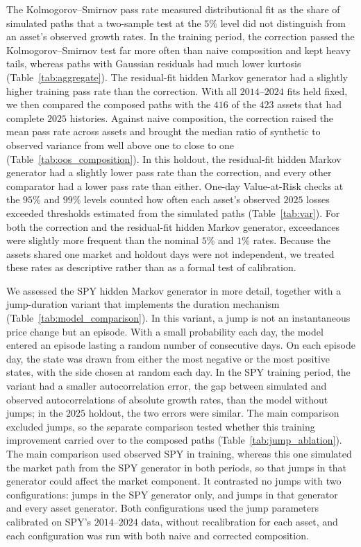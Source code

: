 The Kolmogorov--Smirnov pass rate measured distributional fit as the
share of simulated paths that a two-sample test at the $5\%$ level did
not distinguish from an asset's observed growth rates. In the training period, the correction passed the Kolmogorov--Smirnov
test far more often than naive composition and kept heavy tails,
whereas paths with Gaussian residuals had much lower kurtosis
(Table~\ref{tab:aggregate}).
The residual-fit hidden Markov generator had a slightly higher training
pass rate than the correction. With all $2014$--$2024$ fits held fixed,
we then compared the composed paths with the $416$ of the $423$ assets
that had complete $2025$ histories. Against naive composition, the
correction raised the mean pass rate across assets and brought the
median ratio of synthetic to observed variance from well above one to
close to one (Table~\ref{tab:oos_composition}). In this holdout, the
residual-fit hidden Markov generator had a slightly lower pass rate
than the correction, and every other comparator had a lower pass rate
than either. One-day Value-at-Risk checks at the $95\%$ and $99\%$
levels counted how often each asset's observed $2025$ losses exceeded
thresholds estimated from the simulated paths (Table~\ref{tab:var}).
For both the correction and the residual-fit hidden Markov generator,
exceedances were slightly more frequent than the nominal $5\%$ and
$1\%$ rates. Because the assets shared one market and holdout days were
not independent, we treated these rates as descriptive rather than as a
formal test of calibration.

We assessed the SPY hidden Markov generator in more detail, together
with a jump-duration variant that implements the duration mechanism
(Table~\ref{tab:model_comparison}). In this variant, a jump
is not an instantaneous price change but an episode. With a small
probability each day, the model entered an episode lasting a random
number of consecutive days. On each episode day, the state was drawn
from either the most negative or the most positive states, with the
side chosen at random each day. In the SPY training period, the variant had a smaller autocorrelation
error, the gap between simulated and observed autocorrelations of
absolute growth rates, than the model without jumps; in the $2025$
holdout, the two errors were similar. The main comparison excluded jumps, so the separate comparison tested
whether this training improvement carried over to the composed paths
(Table~\ref{tab:jump_ablation}). The main comparison used observed SPY in training, whereas this one
simulated the market path from the SPY generator in both periods, so
that jumps in that generator could affect the market component. It
contrasted no jumps with two configurations: jumps in the SPY generator
only, and jumps in that generator and every asset generator. Both
configurations used the jump parameters calibrated on SPY's
$2014$--$2024$ data, without recalibration for each asset, and each configuration was run
with both naive and corrected composition.

